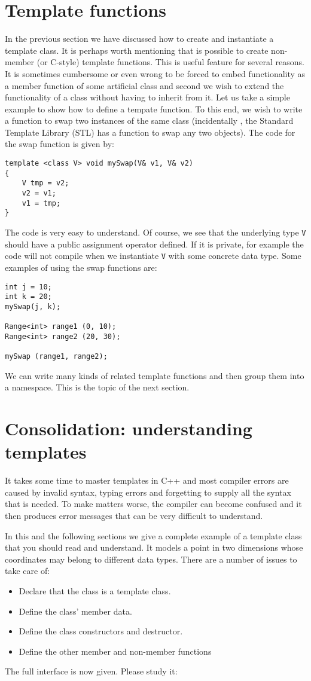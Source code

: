 \section{Template functions}
In the previous section we have discussed how to create and instantiate a template class. It is perhaps worth mentioning that is possible to create non-member (or C-style) template functions. This is useful feature for several reasons. It is sometimes cumbersome or even wrong to be forced to embed functionality as a member function of some artificial class and second we wish to extend the functionality of a class without having to inherit from it. Let us take a simple example to show how to define a tempate function. To this end, we wish to write a function to swap two instances of the same class (incidentally , the Standard Template Library (STL) has a function to swap any two objects). The code for the swap function is given by:
\begin{lstlisting}
template <class V> void mySwap(V& v1, V& v2)
{
	V tmp = v2;
	v2 = v1;
	v1 = tmp;
}
\end{lstlisting}
The code is very easy to understand. Of course, we see that the underlying type \texttt{V} should have a public assignment operator defined. If it is private, for example the code will not compile when we instantiate \texttt{V} with some concrete data type. Some examples of using the swap functions are:
\begin{lstlisting}
int j = 10;
int k = 20;
mySwap(j, k);

Range<int> range1 (0, 10);
Range<int> range2 (20, 30);

mySwap (range1, range2);
\end{lstlisting}
We can write many kinds of related template functions and then group them into a namespace.
This is the topic of the next section.

\section{Consolidation: understanding templates}
It takes some time to master templates in C++ and most compiler errors are caused by invalid syntax, typing errors and forgetting to supply all the syntax that is needed. To make matters worse, the compiler can become confused and it then produces error messages that can be very difficult to understand.

In this and the following sections we give a complete example of a template class that you should read and understand. It models a point in two dimensions whose coordinates may belong to different data types. There are a number of issues to take care of:
\begin{itemize}
	\item Declare that the class is a template class.
	\item Define the class' member data.
	\item Define the class constructors and destructor.
	\item Define the other member and non-member functions
\end{itemize}
The full interface is now given. Please study it:

